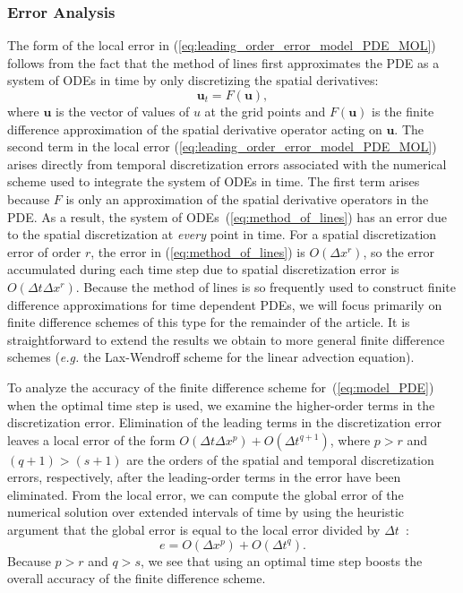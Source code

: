 \documentclass[fleqn,12pt,twoside]{article}
\newcommand{\beq}{\begin{equation}}
\newcommand{\eeq}{\end{equation}}
\def\dt{\Delta t}
\def\dx{\Delta x}
\def\eg{\emph{e.g. }}
\begin{document}
\subsubsection*{\label{sec:error_analysis} 
            Error Analysis}
The form of the local error in 
(\ref{eq:leading_order_error_model_PDE_MOL}) follows from the fact 
that the method of lines first approximates the PDE as a system of ODEs in 
time by only discretizing the spatial derivatives: 
\beq
{\mathbf u}_t = F({\mathbf u}),
\label{eq:method_of_lines}
\eeq
where ${\mathbf u}$ is the vector of values of $u$ at the grid points and
$F({\mathbf u})$ is the finite difference approximation of the spatial 
derivative operator acting on ${\mathbf u}$.  The second term in the local 
error (\ref{eq:leading_order_error_model_PDE_MOL}) arises directly from 
temporal discretization errors associated with the numerical scheme used to 
integrate the system of ODEs in time.  The first term arises because $F$ is 
only an approximation of the spatial derivative operators in the PDE.  As a 
result, the system of ODEs~(\ref{eq:method_of_lines}) has an error due to 
the spatial discretization at \emph{every} point in time.  For a spatial 
discretization error of order $r$, the error in (\ref{eq:method_of_lines}) is 
$O(\dx^r)$, so the error accumulated during each time step due to 
spatial discretization error is $O(\dt \dx^r)$.  Because the method of 
lines is so frequently used to construct finite difference approximations for 
time dependent PDEs, we will focus primarily on finite difference schemes of 
this type for the remainder of the article.  It is straightforward to extend 
the results we obtain to more general finite difference schemes (\eg the
Lax-Wendroff scheme for the linear advection equation). 

To analyze the accuracy of the finite difference scheme 
for~(\ref{eq:model_PDE}) when the optimal time step is used, we examine the 
higher-order terms in the discretization error.  Elimination of the leading 
terms in the discretization error leaves a local error of the form 
$O(\dt \dx^p) + O(\dt^{q+1})$, where $p>r$ and $(q+1) > (s+1)$ are the orders 
of the spatial and temporal discretization errors, respectively, after the 
leading-order terms in the error have been eliminated.  
From the local error, we can compute the global error of the numerical 
solution over extended intervals of time by using the heuristic 
argument that the global error is equal to the local error divided by 
$\dt$~\cite{gko_book}:
\beq
e = O(\dx^p) + O(\dt^q).
\label{eq:global_error_ots}
\eeq
Because $p > r$ and $q > s$, we see that using an optimal time step 
boosts the overall accuracy of the finite difference scheme.
\end{document}

